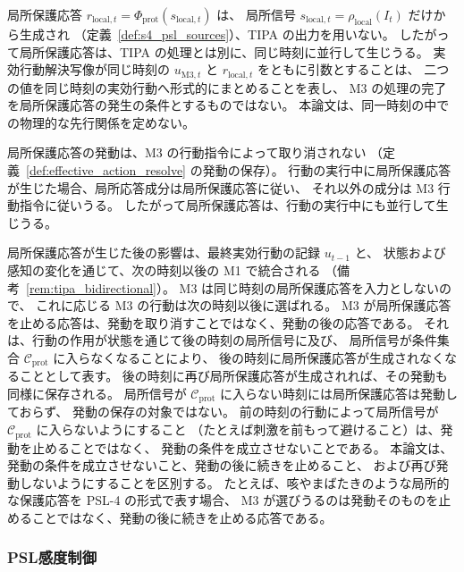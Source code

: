 \begin{remark}
\label{rem:psl4_concurrency}
局所保護応答 $r_{\mathrm{local},t}=\Phi_{\mathrm{prot}}(s_{\mathrm{local},t})$ は、
局所信号 $s_{\mathrm{local},t}=\rho_{\mathrm{local}}(I_t)$ だけから生成され
（定義~\ref{def:s4_psl_sources}）、TIPA の出力を用いない。
したがって局所保護応答は、TIPA の処理とは別に、同じ時刻に並行して生じうる。
実効行動解決写像が同じ時刻の $u_{\mathrm{M3},t}$ と $r_{\mathrm{local},t}$ をともに引数とすることは、
二つの値を同じ時刻の実効行動へ形式的にまとめることを表し、
M3 の処理の完了を局所保護応答の発生の条件とするものではない。
本論文は、同一時刻の中での物理的な先行関係を定めない。

局所保護応答の発動は、M3 の行動指令によって取り消されない
（定義~\ref{def:effective_action_resolve} の発動の保存）。
行動の実行中に局所保護応答が生じた場合、局所応答成分は局所保護応答に従い、
それ以外の成分は M3 行動指令に従いうる。
したがって局所保護応答は、行動の実行中にも並行して生じうる。

局所保護応答が生じた後の影響は、最終実効行動の記録 $u_{t-1}$ と、
状態および感知の変化を通じて、次の時刻以後の M1 で統合される
（備考~\ref{rem:tipa_bidirectional}）。
M3 は同じ時刻の局所保護応答を入力としないので、
これに応じる M3 の行動は次の時刻以後に選ばれる。
M3 が局所保護応答を止める応答は、発動を取り消すことではなく、発動の後の応答である。
それは、行動の作用が状態を通じて後の時刻の局所信号に及び、
局所信号が条件集合 $\mathcal C_{\mathrm{prot}}$ に入らなくなることにより、
後の時刻に局所保護応答が生成されなくなることとして表す。
後の時刻に再び局所保護応答が生成されれば、その発動も同様に保存される。
局所信号が $\mathcal C_{\mathrm{prot}}$ に入らない時刻には局所保護応答は発動しておらず、
発動の保存の対象ではない。
前の時刻の行動によって局所信号が $\mathcal C_{\mathrm{prot}}$ に入らないようにすること
（たとえば刺激を前もって避けること）は、発動を止めることではなく、
発動の条件を成立させないことである。
本論文は、発動の条件を成立させないこと、発動の後に続きを止めること、
および再び発動しないようにすることを区別する。
たとえば、咳やまばたきのような局所的な保護応答を PSL-4 の形式で表す場合、
M3 が選びうるのは発動そのものを止めることではなく、発動の後に続きを止める応答である。
\end{remark}

\subsubsection{PSL感度制御}
\label{subsubsec:psl_sensitivity}

